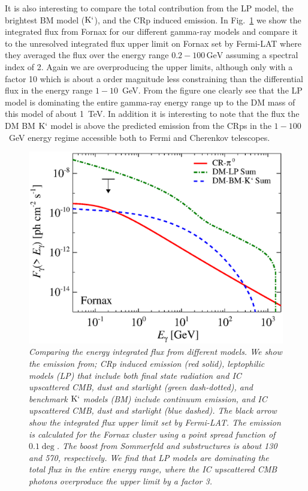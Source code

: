 \documentclass[10pt,aps,pra,reprint,amsmath,amsfonts,amssymb,showpacs]{revtex4-1}
\newcommand{\rmn}{\mathrm}
\newcommand{\Kp}{\rmn{K}`}
\newcommand{\gev}{\rmn{GeV}}
\begin{document}
It is also interesting to compare the total contribution from the LP
model, the brightest BM model ($\Kp$), and the CRp induced emission. In
Fig.~\ref{fig:flux_int} we show the integrated flux from Fornax for
our different gamma-ray models and compare it to the unresolved
integrated flux upper limit on Fornax set by Fermi-LAT where they
averaged the flux over the energy range $0.2-100\,\gev$ assuming a
spectral index of 2. Again we are overproducing the upper limits,
although only with a factor 10 which is about a order magnitude less
constraining than the differential flux in the energy range
$1-10$~GeV. From the figure one clearly see that the LP model is
dominating the entire gamma-ray energy range up to the DM mass of this
model of about 1~TeV. In addition it is interesting to note that the
flux the DM BM $\Kp$ model is above the predicted emission from the
CRps in the $1-100$~GeV energy regime accessible both to Fermi and
Cherenkov telescopes.

\begin{figure}
 \includegraphics[width=0.99\columnwidth]{figures/flux.int.v9.0.1deg.1.6T.SubMass.SF300.IR2.noMW.woGal.eps}
\caption{\it Comparing the energy integrated flux from different
  models. We show the emission from; CRp induced emission (red solid),
  leptophilic models (LP) that include both final state radiation and
  IC upscattered CMB, dust and starlight (green dash-dotted), and
  benchmark $\Kp$ models (BM) include continuum emission, and IC
  upscattered CMB, dust and starlight (blue dashed). The black arrow
  show the integrated flux upper limit set by Fermi-LAT. The emission
  is calculated for the Fornax cluster using a point spread function
  of $0.1\deg$. The boost from Sommerfeld and substructures is about
  130 and 570, respectively. We find that LP models are dominating the
  total flux in the entire energy range, where the IC upscattered CMB
  photons overproduce the upper limit by a factor 3.}
 \label{fig:flux_int}
\end{figure}
\end{document}
